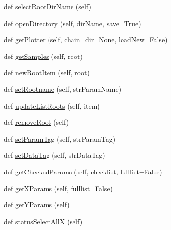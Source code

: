 \begin{DoxyCompactItemize}
\item 
def \mbox{\hyperlink{classgetdist_1_1gui_1_1mainwindow_1_1MainWindow_a1f82d42630833ea1995e22bc60148d27}{select\+Root\+Dir\+Name}} (self)
\item 
def \mbox{\hyperlink{classgetdist_1_1gui_1_1mainwindow_1_1MainWindow_ab4eed3e548a98ed4b789a5cf9324027a}{open\+Directory}} (self, dir\+Name, save=True)
\item 
def \mbox{\hyperlink{classgetdist_1_1gui_1_1mainwindow_1_1MainWindow_a385cc81f23347ee51f9ee4454a676074}{get\+Plotter}} (self, chain\+\_\+dir=None, load\+New=False)
\item 
def \mbox{\hyperlink{classgetdist_1_1gui_1_1mainwindow_1_1MainWindow_aff268010fdbaa0abe118cf5a3b50849f}{get\+Samples}} (self, root)
\item 
def \mbox{\hyperlink{classgetdist_1_1gui_1_1mainwindow_1_1MainWindow_acffec8bd5390cacd428e909ef4cfa449}{new\+Root\+Item}} (self, root)
\item 
def \mbox{\hyperlink{classgetdist_1_1gui_1_1mainwindow_1_1MainWindow_ae2ff20b5ea04f3dbb46a6e6e447e34d7}{set\+Rootname}} (self, str\+Param\+Name)
\item 
def \mbox{\hyperlink{classgetdist_1_1gui_1_1mainwindow_1_1MainWindow_ad510d3ac614da224ce874b5e905ff51c}{update\+List\+Roots}} (self, item)
\item 
def \mbox{\hyperlink{classgetdist_1_1gui_1_1mainwindow_1_1MainWindow_a201a21f90476804e9c5917012c06add2}{remove\+Root}} (self)
\item 
def \mbox{\hyperlink{classgetdist_1_1gui_1_1mainwindow_1_1MainWindow_aceae6c103872070c2383fffa54ee75e9}{set\+Param\+Tag}} (self, str\+Param\+Tag)
\item 
def \mbox{\hyperlink{classgetdist_1_1gui_1_1mainwindow_1_1MainWindow_a8245458267a1ec89415f146dec08a2ef}{set\+Data\+Tag}} (self, str\+Data\+Tag)
\item 
def \mbox{\hyperlink{classgetdist_1_1gui_1_1mainwindow_1_1MainWindow_a6a538cbf9dfa41511637abcdabad7f23}{get\+Checked\+Params}} (self, checklist, fulllist=False)
\item 
def \mbox{\hyperlink{classgetdist_1_1gui_1_1mainwindow_1_1MainWindow_a9f988a9217e030de892f370248a94481}{get\+X\+Params}} (self, fulllist=False)
\item 
def \mbox{\hyperlink{classgetdist_1_1gui_1_1mainwindow_1_1MainWindow_a5a49bcf9798a91781b81e59086d05e61}{get\+Y\+Params}} (self)
\item 
def \mbox{\hyperlink{classgetdist_1_1gui_1_1mainwindow_1_1MainWindow_a82e1f04eb7fe2998e71eabd5db7e4a21}{status\+Select\+AllX}} (self)

\end{DoxyCompactItemize}
